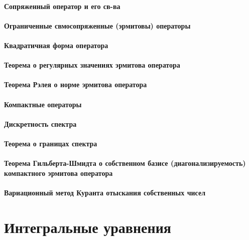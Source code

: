 \documentclass[russian,twocolumn]{article}
\begin{document}
\paragraph{Сопряженный оператор и его св-ва}

\paragraph{Ограниченные свмосопряженные (эрмитовы) операторы}

\paragraph{Квадратичная форма оператора}

\paragraph{Теорема о регулярных значениях эрмитова оператора}

\paragraph{Теорема Рэлея о норме эрмитова оператора}

\paragraph{Компактные операторы}

\paragraph{Дискретность спектра}

\paragraph{Теорема о границах спектра}

\paragraph{Теорема Гильберта-Шмидта о собственном базисе (диагонализируемость) компактного эрмитова оператора}

\paragraph{Вариационный метод Куранта отыскания собственных чисел}

\section{Интегральные уравнения}
\end{document}
